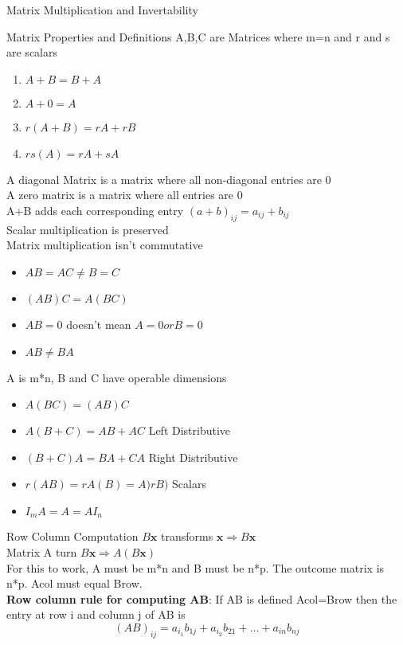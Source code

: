 \documentclass[a4paper, 12pt]{article}
\begin{document}
\begin{section}{Matrix Multiplication and Invertability}
\begin{subsection}{Matrix Properties and Definitions}
A,B,C are Matrices where m=n and r and s are scalars
\begin{enumerate}
\item{$A+B=B+A$}
\item{$A+0=A$}
\item{$r(A+B)=rA+rB$}
\item{$rs(A)=rA+sA$}
\end{enumerate}
A diagonal Matrix is a matrix where all non-diagonal entries are 0\\
A zero matrix is a matrix where all entries are 0\\
A+B adds each corresponding entry $(a+b)_{ij}=a_{ij}+b_{ij}$\\
Scalar multiplication is preserved \\
Matrix multiplication isn't commutative\\
\begin{itemize}
\item{$AB=AC\neq B=C$}
\item{$(AB)C=A(BC)$}
\item{$AB=0$ doesn't mean $A=0 or B=0$}
\item{$AB\neq BA$}
\end{itemize}
A is m*n, B and C have operable dimensions
\begin{itemize}
\item{$A(BC)=(AB)C$}
\item{$A(B+C)=AB+AC$ Left Distributive}
\item{$(B+C)A=BA+CA$ Right Distributive}
\item{$r(AB)=rA(B)=A)rB)$ Scalars}
\item{$I_{m}A=A=AI_{n}$}
\end{itemize}
\end{subsection}

\begin{subsection}{Row Column Computation}
$B\textbf{x}$ transforms $\textbf{x} \Rightarrow B\textbf{x}$\\
Matrix A turn $B\textbf{x}\Rightarrow A(B\textbf{x})$\\
For this to work, A must be m*n and B must be n*p. The outcome matrix
is n*p. Acol must equal Brow.
\\
\textbf{Row column rule for computing AB}: If AB is defined Acol=Brow
then the entry at row i and column j of AB is
\begin{equation}
	(AB)_{ij}=a_{i_1}b_{1j}+a_{i_2}b_{21}+\dots+a_{in}b_{nj}
\end{equation}
\end{subsection}


\end{section}
\end{document}

